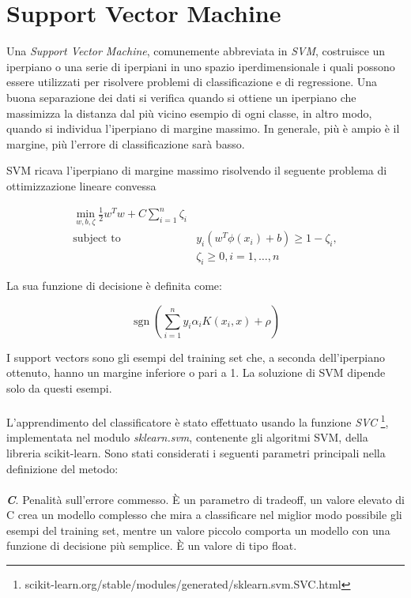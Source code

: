 \documentclass[12pt,a4paper,oneside,hidelinks]{report}
\DeclareMathOperator*{\sgn}{sgn}
\begin{document}
\section{Support Vector Machine}
Una \textit{Support Vector Machine}, comunemente abbreviata in \textit{SVM}, costruisce un iperpiano o una serie di iperpiani in uno spazio iperdimensionale i quali possono essere utilizzati per risolvere problemi di classificazione e di regressione. Una buona separazione dei dati si verifica quando si ottiene un iperpiano che massimizza la distanza dal più vicino esempio di ogni classe, in altro modo, quando si individua l'iperpiano di margine massimo. In generale, più è ampio è il margine, più l'errore di classificazione sarà basso.

SVM ricava l'iperpiano di margine massimo risolvendo il seguente problema di ottimizzazione lineare convessa

\begin{equation} \label{uno}
\begin{split}
\min_ {w, b, \zeta} \frac{1}{2} w^T w + C \sum_{i=1}^{n} \zeta_i \\
\textrm {subject to } & y_i (w^T \phi (x_i) + b) \geq 1 - \zeta_i, \\
& \zeta_i \geq 0, i=1, \dotsc ,n
\end{split}
\end{equation}

La sua funzione di decisione è definita come:

\begin{equation} \label{due}
\sgn(\sum_{i=1}^n y_i \alpha_i K(x_i, x) + \rho)
\end{equation}

I support vectors sono gli esempi del training set che, a seconda dell'iperpiano ottenuto, hanno un margine inferiore o pari a 1. La soluzione di SVM dipende solo da questi esempi.

\paragraph*{}
L'apprendimento del classificatore è stato effettuato usando la funzione \textit{SVC} \footnote{scikit-learn.org/stable/modules/generated/sklearn.svm.SVC.html}, implementata nel modulo \textit{sklearn.svm}, contenente gli algoritmi SVM, della libreria scikit-learn. Sono stati considerati i seguenti parametri principali nella definizione del metodo:

\paragraph*{}
\textbf{\textit{C}}. Penalità sull'errore commesso. È un parametro di tradeoff, un valore elevato di C crea un modello complesso che mira a classificare nel miglior modo possibile gli esempi del training set, mentre un valore piccolo comporta un modello con una funzione di decisione più semplice. È un valore di tipo float. 
\end{document}
